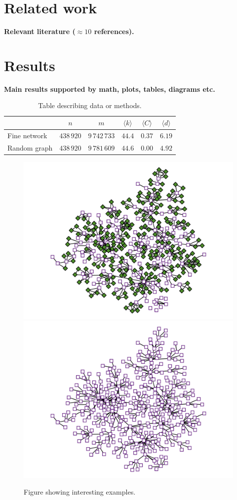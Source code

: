 \documentclass[9pt,twocolumn,twoside]{pnas-report}
\begin{document}
\section*{Related work}

{\bf Relevant literature ($\approx 10$ references).}
\lipsum[5-6]

\nocite{Kle00,Bou05,EB07,New08,For10,New12,FH16,PLC17,PDL18,Pei20}

\section*{Results}

{\bf Main results supported by math, plots, tables, diagrams etc.}
\lipsum[1]

\begin{table}[h]\centering%
	\caption{Table describing data or methods.}
	\begin{tabular}{lccccc}\toprule
	    & $n$ & $m$ & $\langle k\rangle$ & $\langle C\rangle$ & $\langle d\rangle$ \\\midrule
	    Fine network & $438\,920$ & $9\,742\,733$ & $44.4$ & $0.37$ & $6.19$ \\
	    Random graph & $438\,920$ & $9\,781\,609$ & $44.6$ & $0.00$ & $4.92$ \\\bottomrule
	\end{tabular}
	\label{tbl:example}
\end{table}

\lipsum[2-3]

\begin{figure}[t]\centering%
	\includegraphics[width=0.49\linewidth]{example1}
	\includegraphics[width=0.49\linewidth]{example2}
	\caption{Figure showing interesting examples.~\cite{Sub18a}}
\end{figure}
\end{document}
